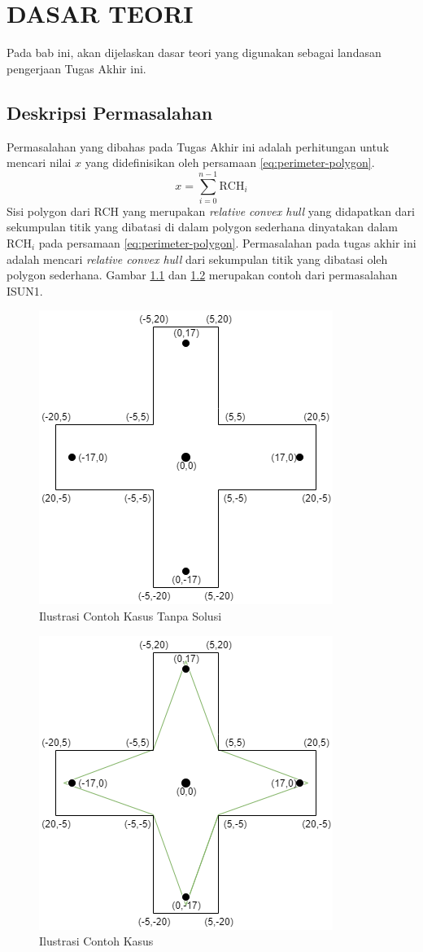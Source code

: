 \chapter {DASAR TEORI}

Pada bab ini, akan dijelaskan dasar teori yang digunakan sebagai landasan pengerjaan Tugas Akhir ini.

\section{ Deskripsi Permasalahan}
Permasalahan yang dibahas pada Tugas Akhir ini adalah perhitungan untuk mencari nilai $x$ yang didefinisikan oleh persamaan \eqref{eq:perimeter-polygon}.
\begin{equation}
    \label{eq:perimeter-polygon}
    x=\sum_{i=0}^{n-1} \text{RCH}_i
\end{equation}
Sisi polygon dari RCH yang merupakan \textit{relative convex hull} yang didapatkan dari sekumpulan titik yang dibatasi di dalam polygon sederhana\cite{isun1} dinyatakan dalam $\text{RCH}_i$ pada persamaan \eqref{eq:perimeter-polygon}. Permasalahan pada tugas akhir ini adalah mencari \textit{relative convex hull} dari sekumpulan titik yang dibatasi oleh polygon sederhana. Gambar \ref{fig:ilustrasi-contoh-kasus-tanpa-solusi} dan \ref{fig:ilustrasi-contoh-kasus} merupakan contoh dari permasalahan ISUN1.
\begin{figure}[!h]
	\Centering
	\includegraphics [width=0.5\columnwidth]{bab2/img/contoh-kasus-tanpa-solusi}
	\caption {Ilustrasi Contoh Kasus Tanpa Solusi}
	\label {fig:ilustrasi-contoh-kasus-tanpa-solusi}
\end{figure}
\begin{figure}[!h]
	\Centering
	\includegraphics [width=0.5\columnwidth]{bab2/img/contoh-kasus}
	\caption {Ilustrasi Contoh Kasus}
	\label {fig:ilustrasi-contoh-kasus}
\end{figure}

